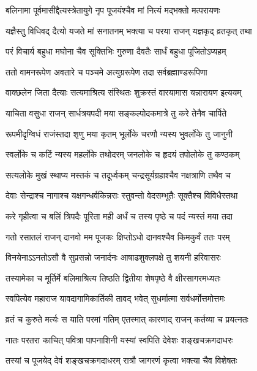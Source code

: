 \twolineshloka
{बलिनामा पूर्वमासीद्दैत्यस्त्रेतायुगे नृप}
{पूजयंश्चैव मां नित्यं मद्भक्तो मत्परायणः}%

\twolineshloka
{यज्ञैस्तु विधिवद् दैत्यो यजते मां सनातनम्}
{भक्त्या च परया राजन् यज्ञकृद् व्रतकृत् तथा}%

\twolineshloka
{परं विचार्य बहुधा मघोना चैव सूक्तिभिः}
{गुरुणा दैवतैः सार्धं बहुधा पूजितोऽप्यहम्}%

\twolineshloka
{ततो वामनरूपेण अवतारे च पञ्चमे}
{अत्युग्ररूपेण तदा सर्वब्रह्माण्डरूपिणा}%

\twolineshloka
{वाक्छलेन जिता दैत्याः सत्यमाश्रित्य संस्थितः}
{शुक्रस्तं वारयामास यन्नारायण इत्ययम्}%

\twolineshloka
{याचिता वसुधा राजन् सार्धत्रयपदी मया}
{सङ्कल्पोदकमात्रे तु करे तेनैव चार्पिते}%

\twolineshloka
{रूपमीदृग्विधं राजंस्तदा शृणु मया कृतम्}
{भूर्लोके चरणौ न्यस्य भुवर्लोके तु जानुनी}%

\twolineshloka
{स्वर्लोके च कटिं न्यस्य महर्लोके तथोदरम्}
{जनलोके च हृदयं तपोलोके तु कण्ठकम्}%

\twolineshloka
{सत्यलोके मुखं स्थाप्य मस्तकं च तदूर्ध्वकम्}
{चन्द्रसूर्यग्रहाश्चैव नक्षत्राणि तथैव च}%

\twolineshloka
{देवाः सेन्द्राश्च नागाश्च यक्षगन्धर्वकिन्नराः}
{स्तुवन्तो वेदसम्भूतैः सूक्तैश्च विविधैस्तथा}%

\twolineshloka
{करे गृहीत्वा च बलिं त्रिपदैः पूरिता मही}
{अर्धं च तस्य पृष्ठे च पदं न्यस्तं मया तदा}%

\twolineshloka
{गतो रसातलं राजन् दानवो मम पूजकः}
{क्षिप्तोऽधो दानवश्चैव किमकुर्वं ततः परम्}%

\twolineshloka
{विनयेनाऽऽनतोऽसौ वै सुप्रसन्नो जनार्दनः}
{आषाढशुक्लपक्षे तु शयनी हरिवासरः}%

\twolineshloka
{तस्यामेका च मूर्तिर्मे बलिमाश्रित्य तिष्ठति}
{द्वितीया शेषपृष्ठे वै क्षीरसागरमध्यतः}%

\twolineshloka
{स्वपित्येव महाराज यावदागामिकार्तिकी}
{तावद् भवेत् सुधर्मात्मा सर्वधर्मोत्तमोत्तमः}%

\twolineshloka
{व्रतं च कुरुते मर्त्यः स याति परमां गतिम्}
{एतस्मात् कारणाद् राजन् कर्तव्या च प्रयत्नतः}%

\twolineshloka
{नातः परतरा काचित् पवित्रा पापनाशिनी}
{यस्यां स्वपिति देवेशः शङ्खचक्रगदाधरः}%

\twolineshloka
{तस्यां च पूजयेद् देवं शङ्खचक्रगदाधरम्}
{रात्रौ जागरणं कृत्वा भक्त्या चैव विशेषतः}%

